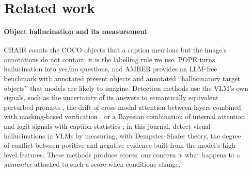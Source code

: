 \section{Related work}\label{sec:related}

\paragraph{Object hallucination and its measurement} CHAIR \citep{rohrbach2018chair} counts the COCO objects \citep{lin2014microsoft} that a caption mentions but the image's annotations do not contain; it is the labelling rule we use. POPE \citep{li2023pope} turns hallucination into yes/no questions, and AMBER \citep{wang2023amber} provides an LLM-free benchmark with annotated present objects and annotated ``hallucinatory target objects'' that models are likely to imagine. Detection methods use the VLM's own signals, such as the uncertainty of its answers to semantically equivalent perturbed prompts \citep{zhang2024vluncertainty}, the drift of cross-modal attention between layers combined with masking-based verification \citep{wen2026cadmp}, or a Bayesian combination of internal attention and logit signals with caption statistics \citep{zohrabi2026haloprobe}; in this journal, \citet{huang2025evidential} detect visual hallucinations in VLMs by measuring, with Dempster--Shafer theory, the degree of conflict between positive and negative evidence built from the model's high-level features. These methods produce scores; our concern is what happens to a \emph{guarantee} attached to such a score when conditions change.

